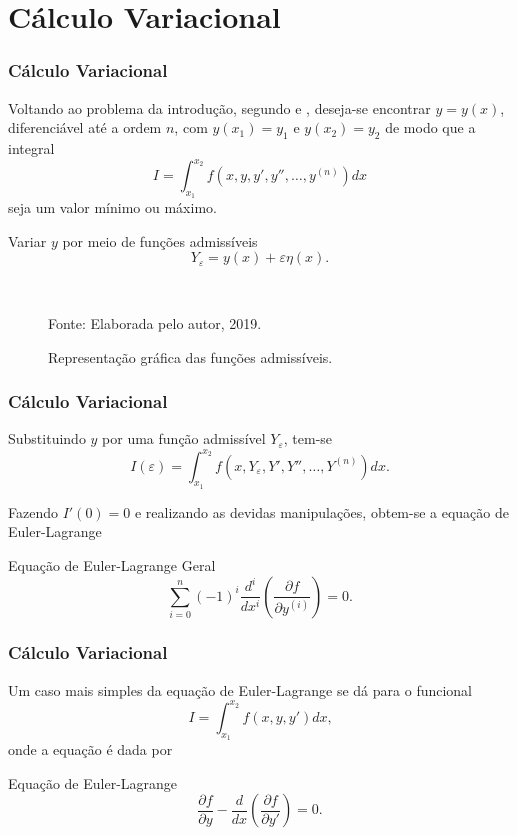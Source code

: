 \documentclass{beamer}
\newcommand{\fonte}[1]{
	\begin{center}
		\footnotesize Fonte: #1
	\end{center}
}
\newcommand{\fonteElaboradaPeloAutor}{
	\fonte{Elaborada pelo autor, 2019.}
}
\newif\ifcompilepause
\newcommand{\cpause}{
	\ifcompilepause
	\pause
	\fi
}
\begin{document}
	\section{Cálculo Variacional}
	
	\begin{frame}
		\frametitle{Cálculo Variacional}
		\justify
		
		Voltando ao problema da introdução, segundo  e , deseja-se encontrar $y=y(x)$, diferenciável até a ordem $n$, com $y(x_1)=y_1$ e $y(x_2)=y_2$ de modo que a integral
		$$
			I = \int_{x_1}^{x_2} f(x, y, y', y'', \dots, y^{(n)})dx
		$$
		seja um valor mínimo ou máximo.
		\vspace{10pt}
		\cpause
		
		Variar $y$ por meio de funções admissíveis
		$$
			Y_{\varepsilon}=y(x)+\varepsilon\eta(x)
			\text{.}
		$$
	\end{frame}
	
	\encapsulateBackgroundLessFrames
	{
		\begin{frame}
			\begin{figure}
				\caption{Representação gráfica das funções admissíveis.}
				\begin{center}
					\resizebox{0.5\textwidth}{!}{
						
					}\\
					\fonteElaboradaPeloAutor
				\end{center}
				\label{fig:func_approx}
			\end{figure}
		\end{frame}
	}

	\begin{frame}
		\frametitle{Cálculo Variacional}
		\justify
		
		Substituindo $y$ por uma função admissível $Y_{\varepsilon}$, tem-se
		$$
			I(\varepsilon) = \int_{x_1}^{x_2} f(x, Y_{\varepsilon}, Y', Y'', \dots, Y^{(n)})dx
			\text{.}
		$$
		\cpause
		
		Fazendo $I'(0)=0$ e realizando as devidas manipulações, obtem-se a equação de Euler-Lagrange
		\begin{block}{Equação de Euler-Lagrange Geral}
			$$
				\sum_{i=0}^n (-1)^i\frac{d^i}{dx^i}\left (
					\frac{\partial f}{\partial y^{(i)}}
				\right )
				= 0
				\text{.}
			$$
		\end{block}
	\end{frame}
	
	\begin{frame}
		\frametitle{Cálculo Variacional}
		\justify

		Um caso mais simples da equação de Euler-Lagrange se dá para o funcional
		$$
			I=\int_{x_1}^{x_2} f(x, y, y')dx
			\text{,}
		$$
		onde a equação é dada por
		
		\begin{block}{Equação de Euler-Lagrange}
			$$
				\frac{\partial f}{\partial y} - \frac{d}{dx} \left ( \frac{\partial f}{\partial y'} \right )=0 \text{.}
			$$
		\end{block}
	\end{frame}
	
\end{document}

